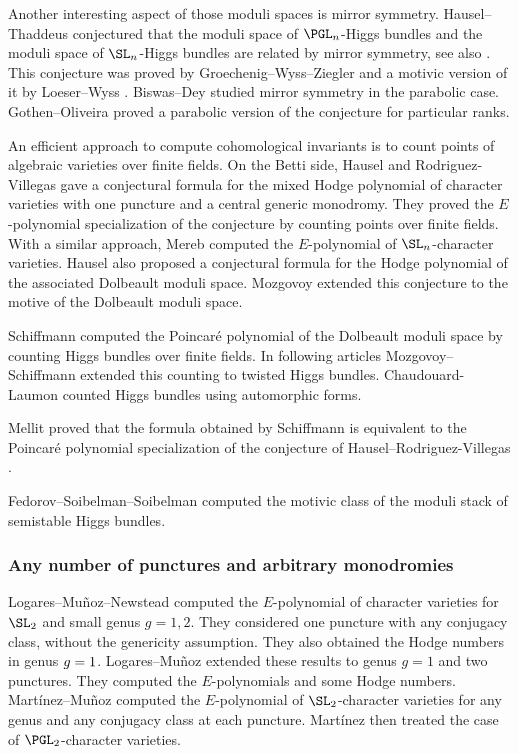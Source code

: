Another interesting aspect of those moduli spaces is mirror symmetry. Hausel--Thaddeus \cite{Hausel_Thaddeus_mirror01,Hausel_Thaddeus_mirror} conjectured that the moduli space of $\PGL_n$-Higgs bundles and the moduli space of $\SL_n$-Higgs bundles are related by mirror symmetry, see also \cite{Hausel_mirror}. This conjecture was proved by Groechenig--Wyss--Ziegler \cite{Groechenig_Wyss_Ziegler_mirror} and a motivic version of it by Loeser--Wyss \cite{Loeser_Wyss}. Biswas--Dey \cite{Biswas_Dey} studied mirror symmetry in the parabolic case.
Gothen--Oliveira \cite{Gothen_Oliveira} proved a parabolic version of the conjecture for particular ranks.

An efficient approach to compute cohomological invariants is to count points of algebraic varieties over finite fields. On the Betti side, Hausel and Rodriguez-Villegas \cite{Hausel_Villegas} gave a conjectural formula for the mixed Hodge polynomial of character varieties with one puncture and a central generic monodromy. They proved the $E$\nobreakdash-poly\-nomial specialization of the conjecture by counting points over finite fields. With a similar approach, Mereb \cite{Mereb} computed the $E$-polynomial of $\SL_n$-character varieties. Hausel \cite{Hausel_mirror} also proposed a conjectural formula for the Hodge polynomial of the associated Dolbeault moduli space. Mozgovoy \cite{Mozgovoy12} extended this conjecture to the motive of the Dolbeault moduli space.

Schiffmann \cite{Schiffmann16} computed the Poincaré polynomial of the Dolbeault moduli space by counting Higgs bundles over finite fields. In following articles \cite{Mozgovoy_Schiffmann_14,Mozgovoy_Schiffmann_2020} Mozgovoy--Schiffmann extended this counting to twisted Higgs bundles. Chaudouard-Laumon \cite{Chaudouard_Laumon_2016} counted Higgs bundles using automorphic forms.

Mellit \cite{Mellit2017} proved that the formula obtained by Schiffmann \cite{Schiffmann16} is equivalent to the Poincaré polynomial specialization of the conjecture of Hausel--Rodriguez-Villegas \cite{Hausel_Villegas}.

Fedorov--Soibelman--Soibelman \cite{Fedorov_Soibelman_Soibelman} computed the motivic class of the moduli stack of semistable Higgs bundles.

\subsubsection{Any number of punctures and arbitrary monodromies}
Logares--Muñoz--New\-stead \cite{Logares_Munoz_Newstead} computed the $E$-polynomial of character varieties for $\SL_2$ and small genus $g=1,2$. They considered one puncture with any conjugacy class, without the genericity assumption. They also obtained the Hodge numbers in genus $g=\nobreak1$.
Logares--Muñoz \cite{Logares_Munoz} extended these results to genus $g=1$ and two punctures. They computed the $E$-polynomials and some Hodge numbers.
Martínez--Muñoz \cite{Martinez_Munoz_14,Martinez_Munoz_14_b} computed the $E$-polynomial of $\SL_2$-character varieties for any genus and any conjugacy class at each puncture. Martínez \cite{Martinez2017} then treated the case of $\PGL_2$-character varieties.

